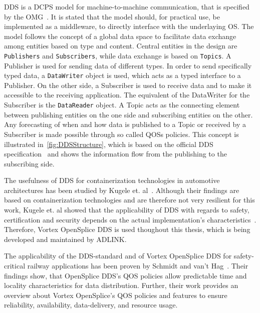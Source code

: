 \Gls*{DDS} is a \gls*{DCPS} model for machine-to-machine communication, that is specified by the \gls*{OMG}~\cite{omgDDSspec}.
It is stated that the model should, for practical use, be implemented as a middleware, to directly interface with the underlaying \gls*{OS}.
The model follows the concept of a global data space to facilitate data exchange among entities based on type and content.
Central entities in the design are \texttt{Publishers} and \texttt{Subscribers}, while data exchange is based on \texttt{Topics}.
A Publisher is used for sending data of different types.
In order to send specifically typed data, a \texttt{DataWriter} object is used, which acts as a typed interface to a Publisher.
On the other side, a Subscriber is used to receive data and to make it accessible to the receiving application.
The equivalent of the DataWriter for the Subscriber is the \texttt{DataReader} object.
A Topic acts as the connecting element between publishing entities on the one side and subscribing entities on the other.
Any forecasting of when and how data is published to a Topic or received by a Subscriber is made possible through so called \glspl*{QOS} policies.
This concept is illustrated in~\autoref{fig:DDSStructure}, which is based on the official \gls*{DDS} specification~\cite{omgDDSspec} and shows the information flow from the publishing to the subscribing side.

The usefulness of \gls*{DDS} for containerization technologies in automotive architectures has been studied by Kugele et. al~\cite{KugeleDataCentricForAuto}.
Although their findings are based on containerization technologies and are therefore not very resilient for this work, Kugele et. al showed that the applicability of \gls*{DDS} with regards to safety, certification and security depends on the actual implementation's characteristics~\cite{KugeleDataCentricForAuto}.
Therefore, Vortex OpenSplice DDS is used thoughout this thesis, which is being developed and maintained by ADLINK.

The applicability of the \gls*{DDS}-standard and of Vortex OpenSplice \gls*{DDS} for safety-critical railway applications has been proven by Schmidt and van't Hag~\cite{SchmidtMissionCriticalChallenges}.
Their findings show, that OpenSplice \gls*{DDS}'s \gls*{QOS} policies allow predictable time and locality characteristics for data distribution.
Further, their work provides an overview about Vortex OpenSplice's \gls*{QOS} policies and features to ensure reliability, availability, data-delivery, and resource usage.

